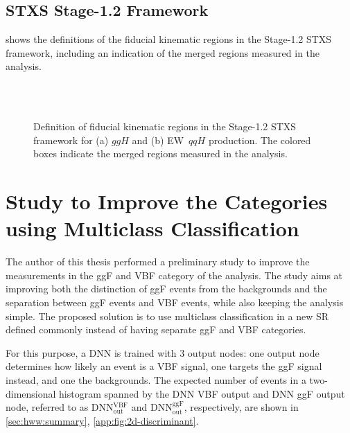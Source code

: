 
\FloatBarrier
\section{STXS Stage-1.2 Framework}
\label{app:stxs-measurements-aux}

 shows the definitions of the fiducial kinematic regions in the Stage-1.2 STXS framework, including an indication of the merged regions measured in the \HWW analysis. 

\begin{figure}[h]
    \centering
     \\
     \\
    {\caption{Definition of fiducial kinematic regions in the Stage-1.2 STXS framework for (a) $ggH$ and (b) EW~$qqH$ production. The colored boxes indicate the merged regions measured in the \HWW analysis.
            \label{fig:stxs:stage-12-definition} }}
\end{figure}


\chapter{Study to Improve the \TwoJet Categories using Multiclass Classification}
\label{app:multi-class-2jet-strategy}
The author of this thesis performed a preliminary study to improve the measurements in the ggF \TwoJet and VBF \TwoJet category of the \HWW analysis. 
The study aims at improving both the distinction of ggF \TwoJet events from the backgrounds and the separation between ggF \TwoJet events and VBF \TwoJet events, while also keeping the analysis simple.
The proposed solution is to use multiclass classification in a new \TwoJet SR defined commonly instead of having separate ggF \TwoJet and VBF \TwoJet categories. 

For this purpose, a DNN is trained with 3 output nodes: one output node determines how likely an event is a VBF signal, one targets the ggF signal instead, and one the backgrounds.
The expected number of events in a two-dimensional histogram spanned by the DNN VBF output and DNN ggF output node, referred to as DNN$_\mathrm{out}^\mathrm{VBF}$ and DNN$_\mathrm{out}^\mathrm{ggF}$, respectively, are shown in \cref{sec:hww:summary}, \cref{app:fig:2d-discriminant}. 


